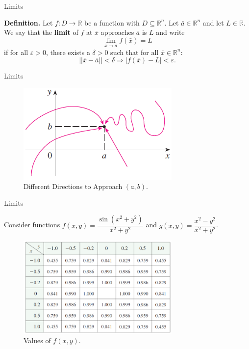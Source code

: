 \documentclass[aspectratio=169, UTF8]{ctexbeamer}
\begin{document}
    \begin{frame}[t]{Limits}
        \begin{block}
            \par \textbf{Definition.} Let $f: D \to \mathbb{R}$ be a function with $D \subseteq \mathbb{R}^n$. Let $\bar{a} \in \mathbb{R}^n$ and let $L \in \mathbb{R}$. We say that the \textbf{limit} of $f$ at $\bar{x}$ approaches $\bar{a}$ is $L$ and write 
            \begin{equation*}
                \lim\limits_{\bar{x} \to \bar{a}} f(\bar{x}) = L
            \end{equation*}
            if for all $\varepsilon > 0$, there exists a $\delta > 0$ such that for all $\bar{x} \in \mathbb{R}^n$: $$||\bar{x} - \bar{a}|| < \delta \Rightarrow |f(\bar{x}) - L| < \varepsilon .$$
        \end{block}
    \end{frame}

    \begin{frame}[t]{Limits}
        \begin{figure}
            \centering 
            \includegraphics[width = 8cm]{f8}
            \caption{Different Directions to Approach $(a,b)$.}
        \end{figure}
    \end{frame}

    \begin{frame}[t]{Limits}
        \par Consider functions $f(x,y) = \dfrac{\sin(x^2+y^2)}{x^2+y^2}$ and $g(x,y) = \dfrac{x^2-y^2}{x^2+y^2}$.
        \begin{figure}
            \centering 
            \includegraphics[width = 8cm]{f5}
            \caption{Values of $f(x,y)$.}
        \end{figure}
    \end{frame}
\end{document}
